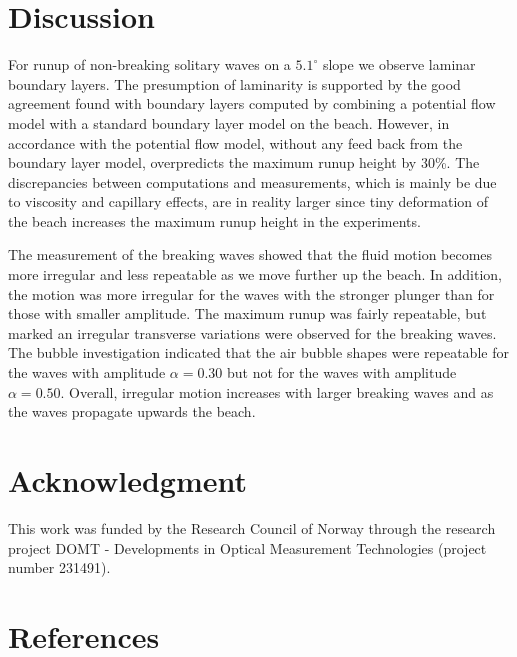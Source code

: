 \documentclass[review, authoryear]{elsarticle}
\begin{document}
\section{Discussion}
\label{con_rem}

For runup of non-breaking solitary waves on a $5.1^\circ$ slope we 
observe laminar boundary layers. The presumption of laminarity is
 supported by the good agreement found with boundary layers computed 
by combining a potential flow model with a standard boundary layer model on the beach. However, in accordance with \cite{pedersen2013runup} the
potential flow model, without any feed back from the boundary layer model, overpredicts the
maximum runup height by  30\%.  
The discrepancies between computations and measurements, which is mainly be due to viscosity and capillary effects, are in reality larger since tiny deformation of the beach increases the maximum runup height in the experiments.

The measurement of the breaking waves showed that the fluid motion becomes more irregular and less repeatable as we move further up the beach. In addition, the motion was more irregular for the waves with the stronger plunger than for those with smaller amplitude. The maximum runup was fairly repeatable, but marked an irregular
transverse  variations were observed for the breaking waves. The bubble investigation indicated
 that the air bubble shapes  were repeatable  for the waves with amplitude $\alpha=0.30$ but not for the waves with amplitude $\alpha=0.50$. Overall, irregular motion increases with larger breaking waves and as the waves propagate upwards the beach.  

\section*{Acknowledgment}

This work was funded by the Research Council of Norway through the research project DOMT - Developments in Optical Measurement Technologies (project number 231491).

\section*{References}

 
\end{document}
